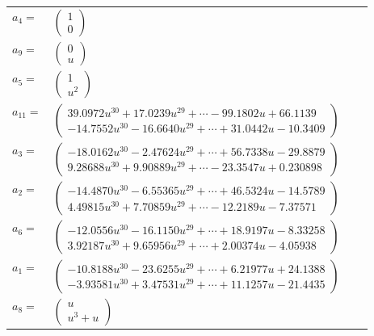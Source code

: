 \documentclass[1p]{elsarticle_modified}
\theoremstyle{definition}
\begin{document}
\begin{tabular}{m{7pt} m{180pt} m{7pt} m{180pt} }
\flushright $a_{4}=$&$\begin{pmatrix}1\\0\end{pmatrix}$ \\
\flushright $a_{9}=$&$\begin{pmatrix}0\\u\end{pmatrix}$ \\
\flushright $a_{5}=$&$\begin{pmatrix}1\\u^2\end{pmatrix}$ \\
\flushright $a_{11}=$&$\begin{pmatrix}39.0972 u^{30}+17.0239 u^{29}+\cdots-99.1802 u+66.1139\\-14.7552 u^{30}-16.6640 u^{29}+\cdots+31.0442 u-10.3409\end{pmatrix}$ \\
\flushright $a_{3}=$&$\begin{pmatrix}-18.0162 u^{30}-2.47624 u^{29}+\cdots+56.7338 u-29.8879\\9.28688 u^{30}+9.90889 u^{29}+\cdots-23.3547 u+0.230898\end{pmatrix}$ \\
\flushright $a_{2}=$&$\begin{pmatrix}-14.4870 u^{30}-6.55365 u^{29}+\cdots+46.5324 u-14.5789\\4.49815 u^{30}+7.70859 u^{29}+\cdots-12.2189 u-7.37571\end{pmatrix}$ \\
\flushright $a_{6}=$&$\begin{pmatrix}-12.0556 u^{30}-16.1150 u^{29}+\cdots+18.9197 u-8.33258\\3.92187 u^{30}+9.65956 u^{29}+\cdots+2.00374 u-4.05938\end{pmatrix}$ \\
\flushright $a_{1}=$&$\begin{pmatrix}-10.8188 u^{30}-23.6255 u^{29}+\cdots+6.21977 u+24.1388\\-3.93581 u^{30}+3.47531 u^{29}+\cdots+11.1257 u-21.4435\end{pmatrix}$ \\
\flushright $a_{8}=$&$\begin{pmatrix}u\\u^3+u\end{pmatrix}$ \\

\end{tabular}
\end{document}
